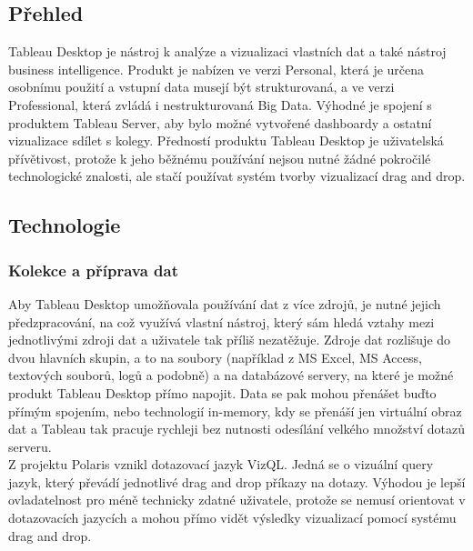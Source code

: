 \documentclass[czech,BP]{thesiskiv}
\begin{document}
 \subsection{Přehled}
 Tableau Desktop je nástroj k analýze a vizualizaci vlastních dat a také nástroj business intelligence. Produkt je nabízen ve verzi Personal, která je určena osobnímu použití a vstupní data musejí být strukturovaná, a ve verzi Professional, která zvládá i nestrukturovaná Big Data. Výhodné je spojení s produktem Tableau Server, aby bylo možné vytvořené dashboardy a ostatní vizualizace sdílet s kolegy. Předností produktu Tableau Desktop je uživatelská přívětivost, protože k jeho běžnému používání nejsou nutné žádné pokročilé technologické znalosti, ale stačí používat systém tvorby vizualizací drag and drop. 
 
 \subsection{Technologie}
 \subsubsection{Kolekce a příprava dat}
 Aby Tableau Desktop umožňovala používání dat z více zdrojů, je nutné jejich předzpracování, na což využívá vlastní nástroj, který sám hledá vztahy mezi jednotlivými zdroji dat a uživatele tak příliš nezatěžuje. Zdroje dat rozlišuje do dvou hlavních skupin, a to na soubory (například z MS Excel, MS Access, textových souborů, logů a podobně) a na databázové servery, na které je možné produkt Tableau Desktop přímo napojit. Data se pak mohou přenášet buďto přímým spojením, nebo technologií in-memory, kdy se přenáší jen virtuální obraz dat a Tableau tak pracuje rychleji bez nutnosti odesílání velkého množství dotazů serveru.
 \\
 Z projektu Polaris vznikl dotazovací jazyk VizQL\texttrademark. Jedná se o vizuální query jazyk, který převádí jednotlivé drag and drop příkazy na dotazy.\cite{VizQL} Výhodou je lepší ovladatelnost pro méně technicky zdatné uživatele, protože se nemusí orientovat v dotazovacích jazycích a mohou přímo vidět výsledky vizualizací pomocí systému drag and drop.
\end{document}
